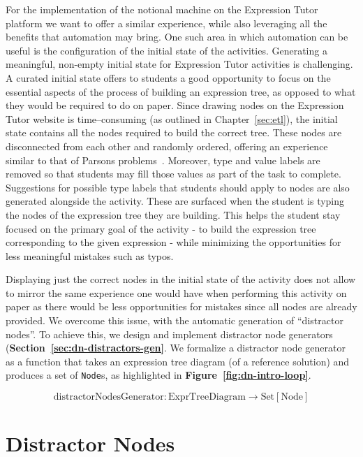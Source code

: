 \begin{chapterBody}
For the implementation of the notional machine on the Expression Tutor platform
we want to offer a similar experience, while also leveraging all the benefits
that automation may bring. One such area in which automation can be useful is
the configuration of the initial state of the activities.
Generating a meaningful, non-empty initial state for Expression Tutor activities
is challenging. A curated initial state offers to students a good opportunity to
focus on the essential aspects of the process of building an expression tree,
as opposed to what they would be required to do on paper.
Since drawing nodes on the Expression Tutor website is time–consuming (as
outlined in Chapter~\ref{sec:etl}), the initial state contains all the nodes
required to build the correct tree. These nodes are disconnected from each
other and randomly ordered, offering an experience similar to that of Parsons
problems~\cite{parsons_parsons_2006}.
Moreover, type and value labels are removed so that students may fill those
values as part of the task to complete.
Suggestions for possible type labels that students should apply
to nodes are also generated alongside the activity.
These are surfaced when the student is typing the nodes of the expression
tree they are building. This helps the student stay focused on the primary goal
of the activity - to build the expression tree corresponding to the
given expression - while minimizing the opportunities for less meaningful
mistakes such as typos.

Displaying just the correct nodes in the initial state of the activity does not
allow to mirror the same experience one would have when performing this activity
on paper as there would be less opportunities for mistakes since all nodes are
already provided. We overcome this issue, with the automatic generation of
``distractor nodes''. To achieve this, we design and implement
distractor node generators (\textbf{Section~\ref{sec:dn-distractors-gen}}.
We formalize a distractor node generator as a function that takes an
expression tree diagram (of a reference solution) and produces a set
of \texttt{Node}s, as highlighted in
\textbf{Figure~\ref{fig:dn-intro-loop}}.

\[
\text{distractorNodesGenerator}:
\text{ExprTreeDiagram}
\rightarrow
\text{Set}\left[\text{Node}\right]
\]

\section{Distractor Nodes}\label{sec:dn-distractors}


\end{chapterBody}
